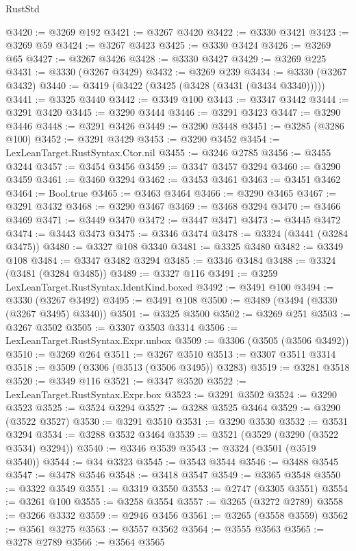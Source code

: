 \begin{lexlean}{RustStd}
\begin{coremodule}
@3420 := @3269 @192
@3421 := @3267 @3420
@3422 := @3330 @3421
@3423 := @3269 @59
@3424 := @3267 @3423
@3425 := @3330 @3424
@3426 := @3269 @65
@3427 := @3267 @3426
@3428 := @3330 @3427
@3429 := @3269 @225
@3431 := @3330 (@3267 @3429)
@3432 := @3269 @239
@3434 := @3330 (@3267 @3432)
@3440 := @3419 (@3422 (@3425 (@3428 (@3431 (@3434 @3340)))))
@3441 := @3325 @3440
@3442 := @3349 @100
@3443 := @3347 @3442
@3444 := @3291 @3420
@3445 := @3290 @3444
@3446 := @3291 @3423
@3447 := @3290 @3446
@3448 := @3291 @3426
@3449 := @3290 @3448
@3451 := @3285 (@3286 @100)
@3452 := @3291 @3429
@3453 := @3290 @3452
@3454 := LexLeanTarget.RustSyntax.Ctor.nil
@3455 := @3246 @2785
@3456 := @3455 @3244
@3457 := @3454 @3456
@3459 := @3347 @3457 @3294
@3460 := @3290 @3459
@3461 := @3460 @3294
@3462 := @3453 @3461
@3463 := @3451 @3462
@3464 := Bool.true
@3465 := @3463 @3464
@3466 := @3290 @3465
@3467 := @3291 @3432
@3468 := @3290 @3467
@3469 := @3468 @3294
@3470 := @3466 @3469
@3471 := @3449 @3470
@3472 := @3447 @3471
@3473 := @3445 @3472
@3474 := @3443 @3473
@3475 := @3346 @3474
@3478 := @3324 (@3441 (@3284 @3475))
@3480 := @3327 @108 @3340
@3481 := @3325 @3480
@3482 := @3349 @108
@3484 := @3347 @3482 @3294
@3485 := @3346 @3484
@3488 := @3324 (@3481 (@3284 @3485))
@3489 := @3327 @116
@3491 := @3259 LexLeanTarget.RustSyntax.IdentKind.boxed
@3492 := @3491 @100
@3494 := @3330 (@3267 @3492)
@3495 := @3491 @108
@3500 := @3489 (@3494 (@3330 (@3267 @3495) @3340))
@3501 := @3325 @3500
@3502 := @3269 @251
@3503 := @3267 @3502
@3505 := @3307 @3503 @3314
@3506 := LexLeanTarget.RustSyntax.Expr.unbox
@3509 := @3306 (@3505 (@3506 @3492))
@3510 := @3269 @264
@3511 := @3267 @3510
@3513 := @3307 @3511 @3314
@3518 := @3509 (@3306 (@3513 (@3506 @3495)) @3283)
@3519 := @3281 @3518
@3520 := @3349 @116
@3521 := @3347 @3520
@3522 := LexLeanTarget.RustSyntax.Expr.box
@3523 := @3291 @3502
@3524 := @3290 @3523
@3525 := @3524 @3294
@3527 := @3288 @3525 @3464
@3529 := @3290 (@3522 @3527)
@3530 := @3291 @3510
@3531 := @3290 @3530
@3532 := @3531 @3294
@3534 := @3288 @3532 @3464
@3539 := @3521 (@3529 (@3290 (@3522 @3534) @3294))
@3540 := @3346 @3539
@3543 := @3324 (@3501 (@3519 @3540))
@3544 := @34 @3323
@3545 := @3543 @3544
@3546 := @3488 @3545
@3547 := @3478 @3546
@3548 := @3418 @3547
@3549 := @3365 @3548
@3550 := @3322 @3549
@3551 := @3319 @3550
@3553 := @2747 (@3305 @3551)
@3554 := @3261 @100
@3555 := @3258 @3554
@3557 := @3265 (@3272 @2789)
@3558 := @3266 @3332
@3559 := @2946 @3456
@3561 := @3265 (@3558 @3559)
@3562 := @3561 @3275
@3563 := @3557 @3562
@3564 := @3555 @3563
@3565 := @3278 @2789
@3566 := @3564 @3565

\end{coremodule}
\end{lexlean}
